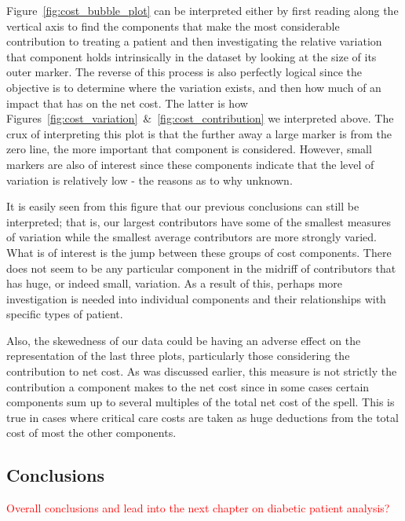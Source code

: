 Figure~\ref{fig:cost_bubble_plot} can be interpreted either by first reading
along the vertical axis to find the components that make the most considerable
contribution to treating a patient and then investigating the relative variation
that component holds intrinsically in the dataset by looking at the size of its
outer marker. The reverse of this process is also perfectly logical since the
objective is to determine where the variation exists, and then how much of an
impact that has on the net cost. The latter is how
Figures~\ref{fig:cost_variation}~\&~\ref{fig:cost_contribution} we interpreted
above. The crux of interpreting this plot is that the further away a large
marker is from the zero line, the more important that component is considered.
However, small markers are also of interest since these components indicate that
the level of variation is relatively low \-- the reasons as to why unknown.

It is easily seen from this figure that our previous conclusions can still be
interpreted; that is, our largest contributors have some of the smallest
measures of variation while the smallest average contributors are more strongly
varied. What is of interest is the jump between these groups of cost components.
There does not seem to be any particular component in the midriff of
contributors that has huge, or indeed small, variation. As a result of this,
perhaps more investigation is needed into individual components and their
relationships with specific types of patient.

Also, the skewedness of our data could be having an adverse effect on the
representation of the last three plots, particularly those considering the
contribution to net cost. As was discussed earlier, this measure is not strictly
the contribution a component makes to the net cost since in some cases certain
components sum up to several multiples of the total net cost of the spell. This
is true in cases where critical care costs are taken as huge deductions from the
total cost of most the other components.

\subsection{Conclusions}

\textcolor{red}{%
    Overall conclusions and lead into the next chapter on diabetic patient
    analysis?
}
